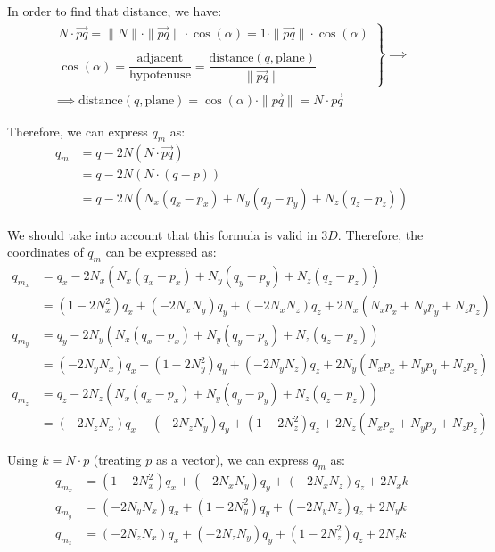 In order to find that distance, we have:
\begin{multline*}
    \left.\begin{array}{c}
        N\cdot \vec{pq} = \|N\|\cdot \|\vec{pq}\| \cdot \cos(\alpha) = 1\cdot \|\vec{pq}\| \cdot \cos(\alpha)\\ \\
        \cos(\alpha) = \dfrac{\text{adjacent}}{\text{hypotenuse}} = \dfrac{\text{distance}(q, \text{plane})}{\|\vec{pq}\|}
    \end{array}\right\} \implies \\ \implies \text{distance}(q, \text{plane}) = \cos(\alpha) \cdot \|\vec{pq}\| = N\cdot \vec{pq}
\end{multline*}

Therefore, we can express $q_m$ as:
\begin{align*}
    q_m &= q - 2N (N\cdot \vec{pq})\\
    &= q - 2N  (N\cdot (q-p))\\
    &= q - 2N  (N_x(q_x-p_x) + N_y(q_y-p_y) + N_z(q_z-p_z))
\end{align*}

We should take into account that this formula is valid in $3D$. Therefore, the coordinates of $q_m$ can be expressed as:
\begin{align*}
    q_{m_x} &= q_x - 2N_x  (N_x(q_x-p_x) + N_y(q_y-p_y) + N_z(q_z-p_z))\\
    &= (1-2N_x^2)q_x + (-2N_xN_y)q_y + (-2N_xN_z)q_z + 2N_x(N_xp_x +N_yp_y + N_zp_z)\\
    q_{m_y} &= q_y - 2N_y  (N_x(q_x-p_x) + N_y(q_y-p_y) + N_z(q_z-p_z))\\
    &= (-2N_yN_x)q_x + (1-2N_y^2)q_y + (-2N_yN_z)q_z + 2N_y(N_xp_x +N_yp_y + N_zp_z)\\
    q_{m_z} &= q_z - 2N_z  (N_x(q_x-p_x) + N_y(q_y-p_y) + N_z(q_z-p_z))\\
    &= (-2N_zN_x)q_x + (-2N_zN_y)q_y + (1-2N_z^2)q_z + 2N_z(N_xp_x +N_yp_y + N_zp_z)
\end{align*}

Using $k=N\cdot p$ (treating $p$ as a vector), we can express $q_m$ as:
\begin{align*}
    q_{m_x} &= (1-2N_x^2)q_x + (-2N_xN_y)q_y + (-2N_xN_z)q_z + 2N_xk\\
    q_{m_y} &= (-2N_yN_x)q_x + (1-2N_y^2)q_y + (-2N_yN_z)q_z + 2N_yk\\
    q_{m_z} &= (-2N_zN_x)q_x + (-2N_zN_y)q_y + (1-2N_z^2)q_z + 2N_zk
\end{align*}

